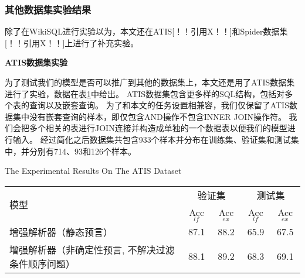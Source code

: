 \subsubsection{其他数据集实验结果}

除了在WikiSQL进行实验以为，本文还在ATIS[！！引用X！！]和Spider数据集[！！引用X！！]上进行了补充实验。

\textbf{ATIS数据集实验}

为了测试我们的模型是否可以推广到其他的数据集上，本文还是用了ATIS数据集进行了实验，数据在表\ref{tab:asjjsdsyjg}中给出。
ATIS数据集包含更多样的SQL结构，包括对多个表的查询以及嵌套查询。
为了和本文的任务设置相兼容，我们仅保留了ATIS数据集中没有嵌套查询的样本，即仅包含AND操作不包含INNER JOIN操作符。
我们会把多个相关的表进行JOIN连接并构造成单独的一个数据表以便我们的模型进行输入。
经过简化之后数据集共包含933个样本并分布在训练集、验证集和测试集中，并分别有714、93和126个样本。

\begin{table}[!htpb]
    {The Experimental Results On The ATIS Dataset}
  \label{tab:asjjsdsyjg}
  \centering
  \begin{threeparttable}[b]
     \begin{tabular}{lcccc}
      \toprule
      \multirow{2}{10mm}{模型}&\multicolumn{2}{c}{验证集} & \multicolumn{2}{c}{测试集}\\
      \cmidrule(lr){2-3}\cmidrule(lr){4-5}
      & Acc$_{lf}$ & Acc$_{ex}$ & Acc$_{lf}$ & Acc$_{ex}$\\
      \midrule
      增强解析器（静态预言） & 87.1 & 88.2 & 65.9 & 67.5\\
      增强解析器（非确定性预言, 不解决过滤条件顺序问题） & 88.1 & 89.2 & 68.3 & 69.1\\
      \bottomrule
    \end{tabular}
  \end{threeparttable}
\end{table}

